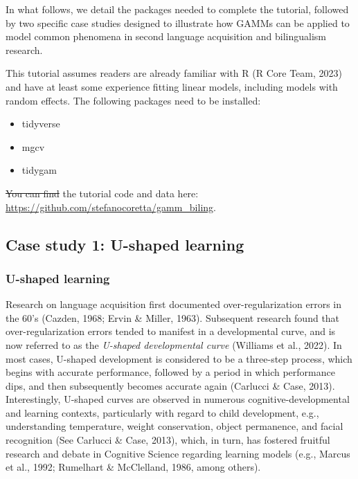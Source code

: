 \documentclass[
  letterpaper,
  DIV=11,
  numbers=noendperiod]{scrartcl}
\providecommand{\DIFadd}[1]{{\protect\color{blue}\uwave{#1}}} %
\providecommand{\DIFdel}[1]{{\protect\color{red}\sout{#1}}}                      %
\providecommand{\DIFaddbegin}{} %
\providecommand{\DIFaddend}{} %
\providecommand{\DIFdelbegin}{} %
\providecommand{\DIFdelend}{} %
\newcommand{\DIFscaledelfig}{0.5}
\newlength{\DIFdelgraphicswidth} %
\newlength{\DIFdelgraphicsheight} %
\newcommand{\DIFaddincludegraphics}[2][]{{\color{blue}\fbox{\DIFOincludegraphics[#1]{#2}}}} %
\newcommand{\DIFdelincludegraphics}[2][]{%
\sbox{\DIFdelgraphicsbox}{\DIFOincludegraphics[#1]{#2}}%
\settoboxwidth{\DIFdelgraphicswidth}{\DIFdelgraphicsbox} %
\settoboxtotalheight{\DIFdelgraphicsheight}{\DIFdelgraphicsbox} %
\scalebox{\DIFscaledelfig}{%
\parbox[b]{\DIFdelgraphicswidth}{\usebox{\DIFdelgraphicsbox}\\[-\baselineskip] \rule{\DIFdelgraphicswidth}{0em}}\llap{\resizebox{\DIFdelgraphicswidth}{\DIFdelgraphicsheight}{%
\setlength{\unitlength}{\DIFdelgraphicswidth}%
\begin{picture}(1,1)%
\thicklines\linethickness{2pt} %
{\color[rgb]{1,0,0}\put(0,0){\framebox(1,1){}}}%
{\color[rgb]{1,0,0}\put(0,0){\line( 1,1){1}}}%
{\color[rgb]{1,0,0}\put(0,1){\line(1,-1){1}}}%
\end{picture}%
}\hspace*{3pt}}} %
} %
\DeclareRobustCommand{\DIFaddbegin}{\DIFOaddbegin \let\includegraphics\DIFaddincludegraphics} %
\DeclareRobustCommand{\DIFaddend}{\DIFOaddend \let\includegraphics\DIFOincludegraphics} %
\DeclareRobustCommand{\DIFdelbegin}{\DIFOdelbegin \let\includegraphics\DIFdelincludegraphics} %
\DeclareRobustCommand{\DIFdelend}{\DIFOaddend \let\includegraphics\DIFOincludegraphics} %
\begin{document}
In what follows, we detail the packages needed to complete the tutorial,
followed by two specific case studies designed to illustrate how GAMMs
can be applied to model common phenomena in second language acquisition
and bilingualism research.

This tutorial assumes readers are already familiar with R (R Core Team,
2023) and have at least some experience fitting linear models, including
models with random effects. The following packages need to be installed:

\begin{itemize}
\item
  tidyverse
\item
  mgcv
\item
  tidygam
\end{itemize}

\DIFdelbegin \DIFdel{You can find }\DIFdelend \DIFaddbegin \DIFadd{All }\DIFaddend the tutorial code and data \DIFaddbegin \DIFadd{are freely available }\DIFaddend here:
\url{https://github.com/stefanocoretta/gamm_biling}.

\subsection{Case study 1: U-shaped
learning}\label{case-study-1-u-shaped-learning}

\subsubsection{U-shaped learning}\label{u-shaped-learning}

Research on language acquisition first documented over-regularization
errors in the 60's (Cazden, 1968; Ervin \& Miller, 1963). Subsequent
research found that over-regularization errors tended to manifest in a
developmental curve, and is now referred to as the \emph{U-shaped
developmental curve} (Williams et al., 2022). In most cases, U-shaped
development is considered to be a three-step process, which begins with
accurate performance, followed by a period in which performance dips,
and then subsequently becomes accurate again (Carlucci \& Case, 2013).
Interestingly, U-shaped curves are observed in numerous
cognitive-developmental and learning contexts, particularly with regard
to child development, e.g., understanding temperature, weight
conservation, object permanence, and facial recognition (See Carlucci \&
Case, 2013), which, in turn, has fostered fruitful research and debate
in Cognitive Science regarding learning models (e.g., Marcus et al.,
1992; Rumelhart \& McClelland, 1986, among others).
\end{document}
